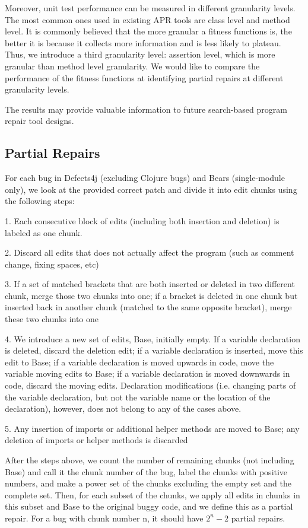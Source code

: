 \documentclass[sigconf, timestamp-false, anonymous=true]{acmart}
\begin{document}
Moreover, unit test performance can be measured in different granularity levels. The most common ones used in existing APR tools are class level and method level. 
It is commonly believed that the more granular a fitness functions is, the better it is because it collects more information and is less likely to plateau. Thus, we introduce a third granularity level: assertion level, which is more granular than method level granularity.
We would like to compare the performance of the fitness functions at identifying partial repairs at different granularity levels.

The results may provide valuable information to future search-based program repair tool designs.

\subsection{Partial Repairs}

For each bug in Defects4j (excluding Clojure bugs) and Bears (single-module only), we look at the provided correct patch and divide it into edit chunks using the following steps:

1. Each consecutive block of edits (including both insertion and deletion) is labeled as one chunk.

2. Discard all edits that does not actually affect the program (such as comment change, fixing spaces, etc)

3. If a set of matched brackets that are both inserted or deleted in two different chunk, merge those two chunks into one; if a bracket is deleted in one chunk but inserted back in another chunk (matched to the same opposite bracket), merge these two chunks into one

4. We introduce a new set of edits, Base, initially empty. If a variable declaration is deleted, discard the deletion edit; if a variable declaration is inserted, move this edit to Base; if a variable declaration is moved upwards in code, move the variable moving edits to Base; if a variable declaration is moved downwards in code, discard the moving edits. Declaration modifications (i.e. changing parts of the variable declaration, but not the variable name or the location of the declaration), however, does not belong to any of the cases above.

5. Any insertion of imports or additional helper methods are moved to Base; any deletion of imports or helper methods is discarded

After the steps above, we count the number of remaining chunks (not including Base) and call it the chunk number of the bug, label the chunks with positive numbers, and make a power set of the chunks excluding the empty set and the complete set. Then, for each subset of the chunks, we apply all edits in chunks in this subset and Base to the original buggy code, and we define this as a partial repair. For a bug with chunk number n, it should have $2^n-2$ partial repairs. 
\end{document}
